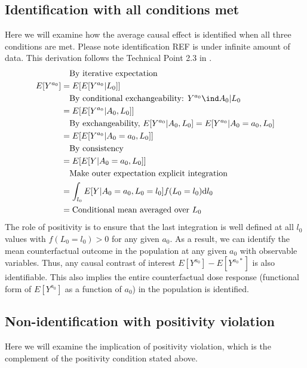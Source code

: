 \documentclass[dvipdfmx,10pt]{article}
\begin{document}
\subsection{Identification with all conditions met}
\label{sec:org9a31f35}
Here we will examine how the average causal effect is identified when all three conditions are met. Please note identification REF is under infinite amount of data. This derivation follows the Technical Point 2.3 in \cite{hernanCausalInference2019}.
\begin{align*}
  &~~~\text{By iterative expectation}\\
  E[Y^{a_{0}}]
  &= E[E[Y^{a_{0}} | L_{0}]]\\
  &~~~\text{By conditional exchangeability: } Y^{a_{0}} \ind A_{0} | L_{0}\\
  &= E[E[Y^{a_{0}} | A_{0}, L_{0}]]\\
  &~~~\text{By exchangeability, }E[Y^{a_{0}} | A_{0}, L_{0}] = E[Y^{a_{0}} | A_{0} = a_{0}, L_{0}]\\
  &= E[E[Y^{a_{0}} | A_{0} = a_{0}, L_{0}]]\\
  &~~~\text{By consistency}\\
  &= E[E[Y | A_{0} = a_{0}, L_{0}]]\\
  &~~~\text{Make outer expectation explicit integration}\\
  &= \int_{l_{0}} E[Y | A_{0} = a_{0}, L_{0} = l_{0}] f(L_{0} = l_{0}) \text{d}l_{0}\\
  &= \text{Conditional mean averaged over $L_{0}$}\\
\end{align*}
The role of positivity is to ensure that the last integration is well defined at all \(l_{0}\) values with \(f(L_{0} = l_{0}) > 0\) for any given \(a_{0}\). As a result, we can identify the mean counterfactual outcome in the population at any given \(a_{0}\) with observable variables. Thus, any causal contrast of interest \(E[Y^{a_{0}}] - E[Y^{a_{0}*}]\) is also identifiable. This also implies the entire counterfactual dose response (functional form of \(E[Y^{a_{0}}]\) as a function of \(a_{0}\)) in the population is identified.

\subsection{Non-identification with positivity violation}
\label{sec:orgf7e27df}
Here we will examine the implication of positivity violation, which is the complement of the positivity condition stated above.
\end{document}
